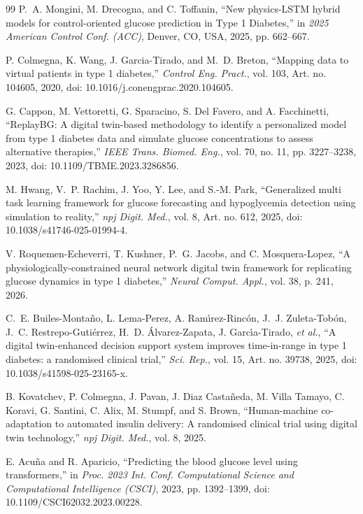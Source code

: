 \documentclass[journal]{IEEEtran}
\begin{document}
\begin{thebibliography}{99}
\label{ref12label} P.~A. Mongini, M. Drecogna, and C. Toffanin, ``New physics-LSTM hybrid models for control-oriented glucose prediction in Type 1 Diabetes,'' in \emph{2025 American Control Conf. (ACC)}, Denver, CO, USA, 2025, pp. 662--667.

\label{ref13label} P. Colmegna, K. Wang, J. Garcia-Tirado, and M.~D. Breton, ``Mapping data to virtual patients in type 1 diabetes,'' \emph{Control Eng. Pract.}, vol. 103, Art. no. 104605, 2020, doi: 10.1016/j.conengprac.2020.104605.

\label{ref14label} G. Cappon, M. Vettoretti, G. Sparacino, S. Del Favero, and A. Facchinetti, ``ReplayBG: A digital twin-based methodology to identify a personalized model from type 1 diabetes data and simulate glucose concentrations to assess alternative therapies,'' \emph{IEEE Trans. Biomed. Eng.}, vol. 70, no. 11, pp. 3227--3238, 2023, doi: 10.1109/TBME.2023.3286856.

\label{ref15label} M. Hwang, V.~P. Rachim, J. Yoo, Y. Lee, and S.-M. Park, ``Generalized multi task learning framework for glucose forecasting and hypoglycemia detection using simulation to reality,'' \emph{npj Digit. Med.}, vol. 8, Art. no. 612, 2025, doi: 10.1038/s41746-025-01994-4.

\label{ref16label} V. Roquemen-Echeverri, T. Kushner, P.~G. Jacobs, and C. Mosquera-Lopez, ``A physiologically-constrained neural network digital twin framework for replicating glucose dynamics in type 1 diabetes,'' \emph{Neural Comput. Appl.}, vol. 38, p. 241, 2026.

\label{ref17label} C.~E. Builes-Monta\~no, L. Lema-Perez, A. Ram\'{\i}rez-Rinc\'on, J.~J. Zuleta-Tob\'on, J.~C. Restrepo-Guti\'errez, H.~D. \'Alvarez-Zapata, J. Garc\'{\i}a-Tirado, \emph{et al.}, ``A digital twin-enhanced decision support system improves time-in-range in type 1 diabetes: a randomised clinical trial,'' \emph{Sci. Rep.}, vol. 15, Art. no. 39738, 2025, doi: 10.1038/s41598-025-23165-x.

\label{ref18label} B. Kovatchev, P. Colmegna, J. Pavan, J. Diaz Casta\~neda, M. Villa Tamayo, C. Koravi, G. Santini, C. Alix, M. Stumpf, and S. Brown, ``Human-machine co-adaptation to automated insulin delivery: A randomised clinical trial using digital twin technology,'' \emph{npj Digit. Med.}, vol. 8, 2025.

\label{ref19label} E. Acu\~{n}a and R. Aparicio, ``Predicting the blood glucose level using transformers,'' in \emph{Proc. 2023 Int. Conf. Computational Science and Computational Intelligence (CSCI)}, 2023, pp. 1392--1399, doi: 10.1109/CSCI62032.2023.00228.


\end{thebibliography}
\end{document}
